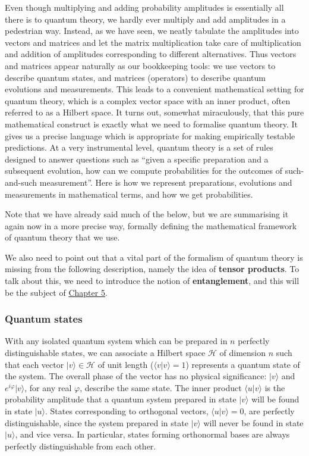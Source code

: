 \documentclass[fleqn]{article}
\begin{document}
Even though multiplying and adding probability amplitudes is essentially all there is to quantum theory, we hardly ever multiply and add amplitudes in a pedestrian way.
Instead, as we have seen, we neatly tabulate the amplitudes into vectors and matrices and let the matrix multiplication take care of multiplication and addition of amplitudes corresponding to different alternatives.
Thus vectors and matrices appear naturally as our bookkeeping tools: we use vectors to describe quantum states, and matrices (operators) to describe quantum evolutions and measurements.
This leads to a convenient mathematical setting for quantum theory, which is a complex vector space with an inner product, often referred to as a Hilbert space.
It turns out, somewhat miraculously, that this pure mathematical construct is exactly what we need to formalise quantum theory.
It gives us a precise language which is appropriate for making empirically testable predictions.
At a very instrumental level, quantum theory is a set of rules designed to answer questions such as ``given a specific preparation and a subsequent evolution, how can we compute probabilities for the outcomes of such-and-such measurement''.
Here is how we represent preparations, evolutions and measurements in mathematical terms, and how we get probabilities.

Note that we have already said much of the below, but we are summarising it again now in a more precise way, formally defining the mathematical framework of quantum theory that we use.

We also need to point out that a vital part of the formalism of quantum theory is missing from the following description, namely the idea of \textbf{tensor products}.
To talk about this, we need to introduce the notion of \textbf{entanglement}, and this will be the subject of \protect\hyperlink{quantum-entanglement}{Chapter 5}.

\hypertarget{quantum-states}{%
\subsubsection{Quantum states}\label{quantum-states}}

With any isolated quantum system which can be prepared in \(n\) perfectly distinguishable states, we can associate a Hilbert space \(\mathcal{H}\) of dimension \(n\) such that each vector \(|v\rangle\in\mathcal{H}\) of unit length (\(\langle v|v\rangle =1\)) represents a quantum state of the system.
The overall phase of the vector has no physical significance: \(|v\rangle\) and \(e^{i\varphi}|v\rangle\), for any real \(\varphi\), describe the same state.
The inner product \(\langle u|v\rangle\) is the probability amplitude that a quantum system prepared in state \(|v\rangle\) will be found in state \(|u\rangle\).
States corresponding to orthogonal vectors, \(\langle u|v\rangle=0\), are perfectly distinguishable, since the system prepared in state \(|v\rangle\) will never be found in state \(|u\rangle\), and vice versa.
In particular, states forming orthonormal bases are always perfectly distinguishable from each other.
\end{document}

